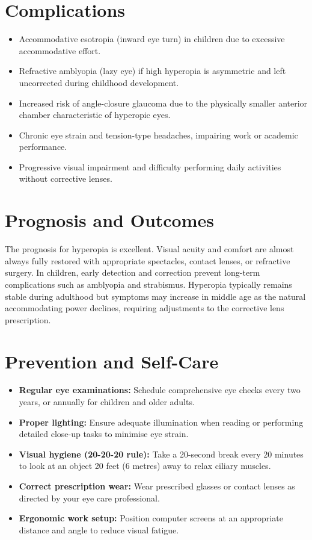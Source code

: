 \section*{Complications}
\begin{itemize}
    \item Accommodative esotropia (inward eye turn) in children due to excessive accommodative effort.
    \item Refractive amblyopia (lazy eye) if high hyperopia is asymmetric and left uncorrected during childhood development.
    \item Increased risk of angle-closure glaucoma due to the physically smaller anterior chamber characteristic of hyperopic eyes.
    \item Chronic eye strain and tension-type headaches, impairing work or academic performance.
    \item Progressive visual impairment and difficulty performing daily activities without corrective lenses.
\end{itemize}

\section*{Prognosis and Outcomes}
The prognosis for hyperopia is excellent. Visual acuity and comfort are almost always fully restored with appropriate spectacles, contact lenses, or refractive surgery. In children, early detection and correction prevent long-term complications such as amblyopia and strabismus. Hyperopia typically remains stable during adulthood but symptoms may increase in middle age as the natural accommodating power declines, requiring adjustments to the corrective lens prescription.

\section*{Prevention and Self-Care}
\begin{itemize}
    \item \textbf{Regular eye examinations:} Schedule comprehensive eye checks every two years, or annually for children and older adults.
    \item \textbf{Proper lighting:} Ensure adequate illumination when reading or performing detailed close-up tasks to minimise eye strain.
    \item \textbf{Visual hygiene (20-20-20 rule):} Take a 20-second break every 20 minutes to look at an object 20 feet (6 metres) away to relax ciliary muscles.
    \item \textbf{Correct prescription wear:} Wear prescribed glasses or contact lenses as directed by your eye care professional.
    \item \textbf{Ergonomic work setup:} Position computer screens at an appropriate distance and angle to reduce visual fatigue.
\end{itemize}

